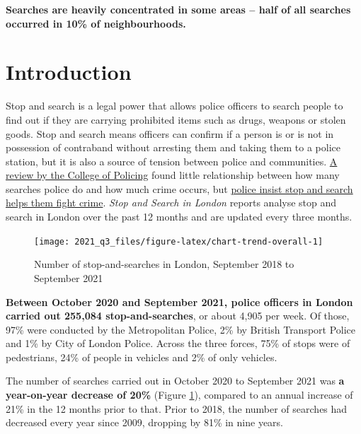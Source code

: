 \documentclass[
  a4paper,
  twoside, 11pt]{article}
\begin{document}
\textbf{\sffamily Searches are heavily concentrated in some areas -- half of all searches occurred in 10\% of neighbourhoods.}

\hypertarget{introduction}{%
\section{Introduction}\label{introduction}}

Stop and search is a legal power that allows police officers to search people to find out if they are carrying prohibited items such as drugs, weapons or stolen goods. Stop and search means officers can confirm if a person is or is not in possession of contraband without arresting them and taking them to a police station, but it is also a source of tension between police and communities. \href{https://whatworks.college.police.uk/Research/Documents/SS_and_crime_report.pdf}{A review by the College of Policing} found little relationship between how many searches police do and how much crime occurs, but \href{https://www.met.police.uk/advice/advice-and-information/st-s/stop-and-search/why-we-use-stop-and-search/}{police insist stop and search helps them fight crime}. \emph{Stop and Search in London} reports analyse stop and search in London over the past 12 months and are updated every three months.



\begin{figure}[bh]

{\centering \texttt{[image: 2021\_q3\_files/figure-latex/chart-trend-overall-1]} 

}

\caption{Number of stop-and-searches in London, September 2018 to September 2021}\label{fig:chart-trend-overall}
\end{figure}

\textbf{Between October 2020 and September 2021, police officers in London carried out 255,084 stop-and-searches}, or about 4,905 per week. Of those, 97\% were conducted by the Metropolitan Police, 2\% by British Transport Police and 1\% by City of London Police. Across the three forces, 75\% of stops were of pedestrians, 24\% of people in vehicles and 2\% of only vehicles.

The number of searches carried out in October 2020 to September 2021 was \textbf{a year-on-year decrease of 20\%} (Figure \ref{fig:chart-trend-overall}), compared to an annual increase of 21\% in the 12 months prior to that. Prior to 2018, the number of searches had decreased every year since 2009, dropping by 81\% in nine years.
\end{document}
